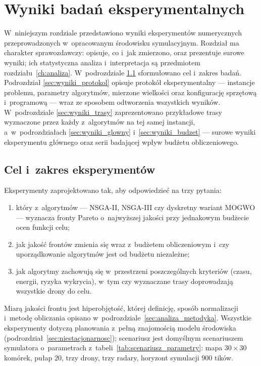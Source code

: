 \chapter{Wyniki badań eksperymentalnych}
\label{ch:wyniki}

W~niniejszym rozdziale przedstawiono wyniki eksperymentów numerycznych
przeprowadzonych w~opracowanym środowisku symulacyjnym. Rozdział ma charakter
sprawozdawczy: opisuje, co i~jak zmierzono, oraz prezentuje surowe wyniki;
ich statystyczna analiza i~interpretacja są przedmiotem
rozdziału~\ref{ch:analiza}. W~podrozdziale \ref{sec:wyniki_cel} sformułowano
cel i~zakres badań. Podrozdział \ref{sec:wyniki_protokol} opisuje protokół
eksperymentalny --- instancje problemu, parametry algorytmów, mierzone wielkości
oraz konfigurację sprzętową i~programową --- wraz ze sposobem odtworzenia
wszystkich wyników. W~podrozdziale \ref{sec:wyniki_trasy} zaprezentowano
przykładowe trasy wyznaczone przez każdy z~algorytmów na tej samej instancji,
a~w~podrozdziałach \ref{sec:wyniki_glowny} i~\ref{sec:wyniki_budzet} --- surowe
wyniki eksperymentu głównego oraz serii badającej wpływ budżetu obliczeniowego.

\section{Cel i~zakres eksperymentów}
\label{sec:wyniki_cel}

Eksperymenty zaprojektowano tak, aby odpowiedzieć na trzy pytania:
\begin{enumerate}
    \item który z~algorytmów --- NSGA-II, NSGA-III czy dyskretny wariant MOGWO
    --- wyznacza fronty Pareto o~najwyższej jakości przy jednakowym budżecie
    ocen funkcji celu;
    \item jak jakość frontów zmienia się wraz z~budżetem obliczeniowym i~czy
    uporządkowanie algorytmów jest od budżetu niezależne;
    \item jak algorytmy zachowują się w~przestrzeni poszczególnych kryteriów
    (czasu, energii, ryzyka wykrycia), w~tym czy wyznaczane trasy doprowadzają
    wszystkie drony do celu.
\end{enumerate}
Miarą jakości frontu jest hiperobjętość, której definicję, sposób normalizacji
i~metodę obliczania opisano w~podrozdziale~\ref{sec:analiza_metodyka}.
Wszystkie eksperymenty dotyczą planowania z~pełną znajomością modelu
środowiska (podrozdział~\ref{sec:niestacjonarnosc}); scenariusz jest
domyślnym scenariuszem symulatora o~parametrach z~tabeli~\ref{tab:scenariusz_parametry}:
mapa $30 \times 30$ komórek, pułap $20$, trzy drony, trzy radary, horyzont
symulacji $900$ tików.

